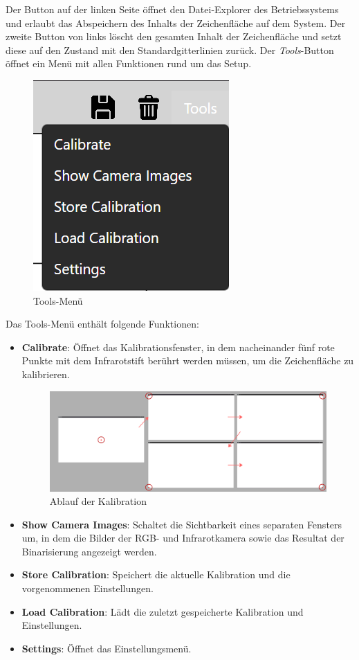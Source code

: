 Der Button auf der linken Seite öffnet den Datei-Explorer des Betriebssystems und erlaubt das Abspeichern des Inhalts der Zeichenfläche auf dem System.  
Der zweite Button von links löscht den gesamten Inhalt der Zeichenfläche und setzt diese auf den Zustand mit den Standardgitterlinien zurück.  
Der \emph{Tools}-Button öffnet ein Menü mit allen Funktionen rund um das Setup.

\begin{figure}[H]
    \centering
    \includegraphics[width=0.5\linewidth]{graphics/toolsmenu.png}
    \caption{Tools-Menü}
    \label{fig:toolsmenu}
\end{figure}

Das Tools-Menü enthält folgende Funktionen:
\begin{itemize}
    \item \textbf{Calibrate}: Öffnet das Kalibrationsfenster, in dem nacheinander fünf rote Punkte mit dem Infrarotstift berührt werden müssen, um die Zeichenfläche zu kalibrieren.
    \begin{figure}[H]
        \centering
        \includegraphics[width=0.5\linewidth]{graphics/ablauf_kalibration.png}
        \caption{Ablauf der Kalibration}
        \label{fig:ablauf_kalibration}
    \end{figure}
    \item \textbf{Show Camera Images}: Schaltet die Sichtbarkeit eines separaten Fensters um, in dem die Bilder der RGB- und Infrarotkamera sowie das Resultat der Binarisierung angezeigt werden.
    \item \textbf{Store Calibration}: Speichert die aktuelle Kalibration und die vorgenommenen Einstellungen.
    \item \textbf{Load Calibration}: Lädt die zuletzt gespeicherte Kalibration und Einstellungen.
    \item \textbf{Settings}: Öffnet das Einstellungsmenü.
\end{itemize}

